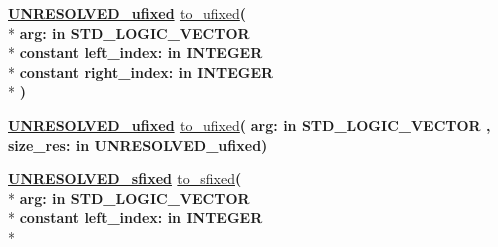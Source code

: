 \begin{DoxyCompactItemize}
\item 
{\bfseries {\bfseries {\bfseries \hyperlink{classfixed__pkg_ae78bc2b36d22f6abeac163955e8a587d}{U\+N\+R\+E\+S\+O\+L\+V\+E\+D\+\_\+ufixed}} \textcolor{vhdlchar}{ }}} \hyperlink{classfixed__pkg_ae9cf50571e74e38ef01f8a47789c29fc}{to\+\_\+ufixed}{\bfseries  ( }\\*
{\bfseries \textcolor{vhdlchar}{arg\+: }\textcolor{stringliteral}{in }{\bfseries \textcolor{comment}{S\+T\+D\+\_\+\+L\+O\+G\+I\+C\+\_\+\+V\+E\+C\+T\+O\+R}\textcolor{vhdlchar}{ }}}\\*
{\bfseries {\bfseries \textcolor{keywordflow}{constant}\textcolor{vhdlchar}{ }}\textcolor{vhdlchar}{left\+\_\+index\+: }\textcolor{stringliteral}{in }{\bfseries \textcolor{comment}{I\+N\+T\+E\+G\+E\+R}\textcolor{vhdlchar}{ }}}\\*
{\bfseries {\bfseries \textcolor{keywordflow}{constant}\textcolor{vhdlchar}{ }}\textcolor{vhdlchar}{right\+\_\+index\+: }\textcolor{stringliteral}{in }{\bfseries \textcolor{comment}{I\+N\+T\+E\+G\+E\+R}\textcolor{vhdlchar}{ }}}\\*
{\bfseries  )} 
\item 
{\bfseries {\bfseries {\bfseries \hyperlink{classfixed__pkg_ae78bc2b36d22f6abeac163955e8a587d}{U\+N\+R\+E\+S\+O\+L\+V\+E\+D\+\_\+ufixed}} \textcolor{vhdlchar}{ }}} \hyperlink{classfixed__pkg_af26dc87215f262aaa602a93f0fc9c123}{to\+\_\+ufixed}{\bfseries  ( }{\bfseries \textcolor{vhdlchar}{arg\+: }\textcolor{stringliteral}{in }{\bfseries \textcolor{comment}{S\+T\+D\+\_\+\+L\+O\+G\+I\+C\+\_\+\+V\+E\+C\+T\+O\+R}\textcolor{vhdlchar}{ }}}{\bfseries  , \textcolor{vhdlchar}{size\+\_\+res\+: }\textcolor{stringliteral}{in }\textcolor{vhdlchar}{U\+N\+R\+E\+S\+O\+L\+V\+E\+D\+\_\+ufixed}}{\bfseries  )} 
\item 
{\bfseries {\bfseries {\bfseries \hyperlink{classfixed__pkg_aa723b28a027c3c0f9bca02d75e8df4d6}{U\+N\+R\+E\+S\+O\+L\+V\+E\+D\+\_\+sfixed}} \textcolor{vhdlchar}{ }}} \hyperlink{classfixed__pkg_af46256039c7dcae5645c9522a0d7a78f}{to\+\_\+sfixed}{\bfseries  ( }\\*
{\bfseries \textcolor{vhdlchar}{arg\+: }\textcolor{stringliteral}{in }{\bfseries \textcolor{comment}{S\+T\+D\+\_\+\+L\+O\+G\+I\+C\+\_\+\+V\+E\+C\+T\+O\+R}\textcolor{vhdlchar}{ }}}\\*
{\bfseries {\bfseries \textcolor{keywordflow}{constant}\textcolor{vhdlchar}{ }}\textcolor{vhdlchar}{left\+\_\+index\+: }\textcolor{stringliteral}{in }{\bfseries \textcolor{comment}{I\+N\+T\+E\+G\+E\+R}\textcolor{vhdlchar}{ }}}\\*

\end{DoxyCompactItemize}
